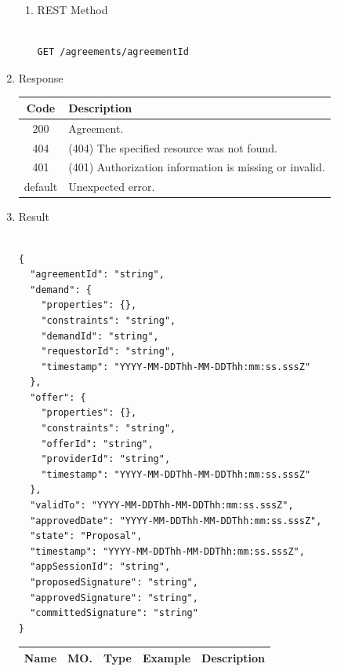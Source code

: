 \begin{enumerate}
\begin{enumerate}
\item REST Method

\begin{tcolorbox}[boxrule=0pt, frame empty]
\begin{verbatim} 

GET /agreements/agreementId

\end{verbatim}
\end{tcolorbox}

\end{enumerate}

\item Response

\begin{center}
\begin{tabular}{|c|l|} 
\hline
\rowcolor{lightgray}	Code 		& 	Description \\
\hline
200	 		&	Agreement. \\
\hline
404			&	(404) The specified resource was not found. \\
\hline
401			&	(401) Authorization information is missing or invalid. \\
\hline
default		&	Unexpected error. \\
\hline
\end{tabular}
\end{center}


\item Result

\begin{tcolorbox}[boxrule=0pt, frame empty]
\begin{verbatim}

{
  "agreementId": "string",
  "demand": {
    "properties": {},
    "constraints": "string",
    "demandId": "string",
    "requestorId": "string",
    "timestamp": "YYYY-MM-DDThh-MM-DDThh:mm:ss.sssZ"
  },
  "offer": {
    "properties": {},
    "constraints": "string",
    "offerId": "string",
    "providerId": "string",
    "timestamp": "YYYY-MM-DDThh-MM-DDThh:mm:ss.sssZ"
  },
  "validTo": "YYYY-MM-DDThh-MM-DDThh:mm:ss.sssZ",
  "approvedDate": "YYYY-MM-DDThh-MM-DDThh:mm:ss.sssZ",
  "state": "Proposal",
  "timestamp": "YYYY-MM-DDThh-MM-DDThh:mm:ss.sssZ",
  "appSessionId": "string",
  "proposedSignature": "string",
  "approvedSignature": "string",
  "committedSignature": "string"
}

\end{verbatim}
\end{tcolorbox}

\begin{center}
\begin{tabular}{|p{3cm}|l|p{3cm}|p{3cm}|p{4cm}|} 
\hline
\rowcolor{lightgray}	Name	& MO.	& Type	& Example & 	Description \\
\hline


\end{tabular}
\end{center}
\end{enumerate}
